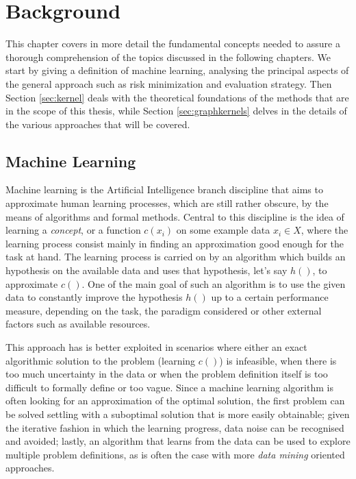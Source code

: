 
\chapter{Background} %
This chapter covers in more detail the fundamental concepts needed to assure a
thorough comprehension of the topics discussed in the following chapters.
We start by giving a definition of machine learning, analysing the 
principal aspects of the general approach such as risk minimization and evaluation
strategy.
Then Section \ref{sec:kernel} deals with the theoretical foundations of the 
methods that are in the scope of this thesis, while Section \ref{sec:graphkernels}
delves in the details of the various approaches that will be covered.

\label{Chapter2} %

\section{Machine Learning}

Machine learning is the Artificial Intelligence branch discipline that aims
to approximate human learning processes, which are still rather obscure,
by the means of algorithms and formal methods.
Central to this discipline is the idea of learning a \emph{concept}, or a function
$c(x_i)$ on some example data $x_i \in X$, where the learning process consist
mainly in finding an approximation good enough for the task at hand.
The learning process is carried on by an algorithm which builds an hypothesis
on the available data and uses that hypothesis, let's say $h()$,  to approximate
$c()$.
One of the main goal of such an algorithm is to use the given data to constantly
improve the hypothesis $h()$ up to a certain performance measure, depending
on the task, the paradigm considered or other external factors such as available
resources.

This approach has is better exploited in scenarios where either an exact
algorithmic solution to the problem (learning $c()$) is infeasible, when there is
too much uncertainty in the data or when the problem definition itself is too
difficult to formally define or too vague.
Since a machine learning algorithm is often looking for an approximation of the 
optimal solution, the first problem can be solved settling with a suboptimal
solution that is more easily obtainable; given the iterative fashion in which
the learning progress, data noise can be recognised and avoided; lastly,
an algorithm that learns from the data can be used to explore multiple problem
definitions, as is often the case with more \emph{data mining} oriented approaches.


